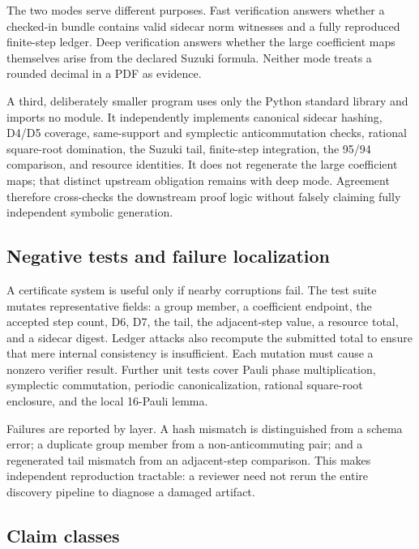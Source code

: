 The two modes serve different purposes.  Fast verification answers whether a
checked-in bundle contains valid sidecar norm witnesses and a fully reproduced
finite-step ledger.  Deep verification answers whether the large coefficient
maps themselves arise from the declared Suzuki formula.  Neither mode treats a
rounded decimal in a PDF as evidence.

A third, deliberately smaller program uses only the Python standard library
and imports no  module.  It independently implements
canonical sidecar hashing, D4/D5 coverage, same-support and symplectic
anticommutation checks, rational square-root domination, the Suzuki tail,
finite-step integration, the 95/94 comparison, and resource identities.  It
does not regenerate the large coefficient maps; that distinct upstream
obligation remains with deep mode.  Agreement therefore cross-checks the
downstream proof logic without falsely claiming fully independent symbolic
generation.

\subsection{Negative tests and failure localization}

A certificate system is useful only if nearby corruptions fail.  The test
suite mutates representative fields: a group member, a coefficient endpoint,
the accepted step count, D6, D7, the tail, the adjacent-step value, a resource
total, and a sidecar digest.  Ledger attacks also recompute the submitted total
to ensure that mere internal consistency is insufficient.  Each mutation must
cause a nonzero verifier result.  Further unit tests cover Pauli phase
multiplication, symplectic commutation, periodic canonicalization, rational
square-root enclosure, and the local 16-Pauli lemma.

Failures are reported by layer.  A hash mismatch is distinguished from a
schema error; a duplicate group member from a non-anticommuting pair; and a
regenerated tail mismatch from an adjacent-step comparison.  This makes independent
reproduction tractable: a reviewer need not rerun the entire discovery
pipeline to diagnose a damaged artifact.

\subsection{Claim classes}

